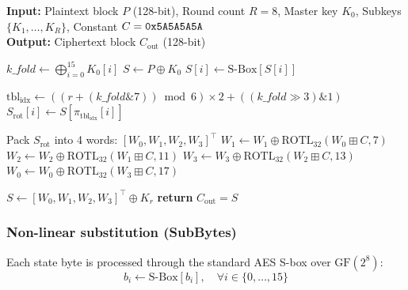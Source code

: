 \documentclass[review,12pt]{elsarticle}
\begin{document}
\begin{algorithm}[htbp]
\footnotesize
\caption{Tesseract-128 encryption pipeline.}
\label{alg:tesseract_enc}
\textbf{Input:} Plaintext block $P$ (128-bit), Round count $R=8$, Master key $K_0$, Subkeys $\{K_1, \dots, K_R\}$, Constant $C = \text{\texttt{0x5A5A5A5A}}$ \\
\textbf{Output:} Ciphertext block $C_{\text{out}}$ (128-bit)
\begin{algorithmic}[1]
\STATE {}
\STATE $\mathit{k\_fold} \leftarrow \bigoplus_{i=0}^{15} K_0[i]$
\STATE $S \leftarrow P \oplus K_0$
\STATE {}
    \STATE {}
        \STATE $S[i] \leftarrow \text{S-Box}[S[i]]$
    \ENDFOR
    
    \STATE {}
    \STATE $\text{tbl}_{\text{idx}} \leftarrow \left( (r + (\mathit{k\_fold} \mathbin{\&} 7)) \bmod 6 \right) \times 2 + ((\mathit{k\_fold} \gg 3) \mathbin{\&} 1)$
        \STATE $S_{\text{rot}}[i] \leftarrow S[\pi_{\text{tbl}_{\text{idx}}}[i]]$
    \ENDFOR
    
    \STATE {}
    \STATE Pack $S_{\text{rot}}$ into 4 words: $[W_0, W_1, W_2, W_3]^\top$
    \STATE $W_1 \leftarrow W_1 \oplus \text{ROTL}_{32}(W_0 \boxplus C, 7)$
    \STATE $W_2 \leftarrow W_2 \oplus \text{ROTL}_{32}(W_1 \boxplus C, 11)$
    \STATE $W_3 \leftarrow W_3 \oplus \text{ROTL}_{32}(W_2 \boxplus C, 13)$
    \STATE $W_0 \leftarrow W_0 \oplus \text{ROTL}_{32}(W_3 \boxplus C, 17)$
    
    \STATE {}
    \STATE $S \leftarrow [W_0, W_1, W_2, W_3]^\top \oplus K_r$
\ENDFOR
\STATE {}
\STATE \textbf{return} $C_{\text{out}} = S$
\end{algorithmic}
\end{algorithm}

\subsubsection{Non-linear substitution (SubBytes)}
Each state byte is processed through the standard AES S-box over $\text{GF}(2^8)$:
\begin{equation}
    b_i \leftarrow \text{S-Box}[b_i], \quad \forall i \in \{0, \dots, 15\}
\end{equation}
\end{document}

